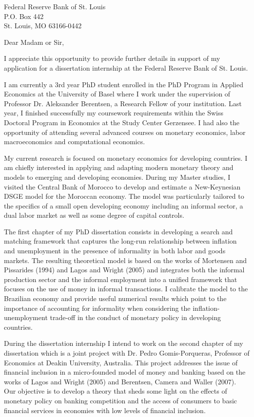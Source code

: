 \documentclass[10pt,a4paper]{letter}
\begin{document}
 
\begin{letter}{Federal Reserve Bank of St. Louis \\ P.O. Box 442 \\ St. Louis, MO 63166-0442} 
\opening{Dear Madam or Sir,} 
 
I appreciate this opportunity to provide further details in support of my application for a dissertation internship at the Federal Reserve Bank of St. Louis.

I am currently a 3rd year PhD student enrolled in the PhD Program in Applied Economics at the University of Basel where I work under the supervision of Professor Dr. Aleksander Berentsen, a Research Fellow of your institution. Last year, I finished successfully my coursework requirements within the Swiss Doctoral Program in Economics at the Study Center Gerzensee. I had also the opportunity of attending several advanced courses on monetary economics, labor macroeconomics and computational economics.

My current research is focused on monetary economics for developing countries. I am chiefly interested in applying and adapting modern monetary theory and models to emerging and developing economies. During my Master studies, I visited the Central Bank of Morocco to develop and estimate a New-Keynesian DSGE model for the Moroccan economy. The model was particularly tailored to the specifics of a small open developing economy including an informal sector, a dual labor market as well as some degree of capital controls.

The first chapter of my PhD dissertation consists in developing a search and matching framework that captures the long-run relationship between inflation and unemployment in the presence of informality in both labor and goods markets. The resulting theoretical model is based on the works of Mortensen and Pissarides (1994) and Lagos and Wright (2005) and integrates both the informal production sector and the informal employment into a unified framework that focuses on the use of money in informal transactions. I calibrate the model to the Brazilian economy and provide useful numerical results which point to the importance of accounting for informality when considering the inflation-unemployment trade-off in the conduct of monetary policy in developing countries.

During the dissertation internship I intend to work on the second chapter of my dissertation which is a joint project with Dr. Pedro Gomis-Porqueras, Professor of Economics at Deakin University, Australia. This project addresses the issue of financial inclusion in a micro-founded model of money and banking based on the works of Lagos and Wright (2005) and Berentsen, Camera and Waller (2007). Our objective is to develop a theory that sheds some light on the effects of monetary policy on banking competition and the access of consumers to basic financial services in economies with low levels of financial inclusion.


\end{letter}
\end{document}
